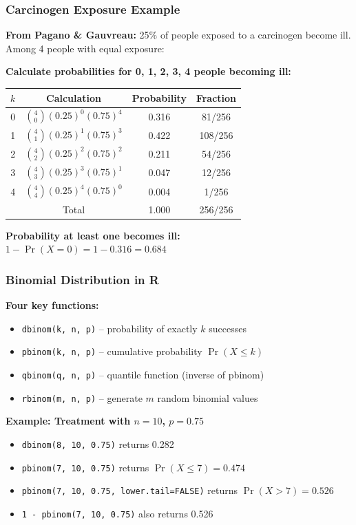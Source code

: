 \documentclass{beamer}
\begin{document}
\begin{frame}
\frametitle{Carcinogen Exposure Example}
\textbf{From Pagano \& Gauvreau:} 25\% of people exposed to a carcinogen become ill. Among 4 people with equal exposure:

\vspace{0.3cm}
\textbf{Calculate probabilities for 0, 1, 2, 3, 4 people becoming ill:}

\begin{center}
\begin{tabular}{cccc}
\toprule
$k$ & Calculation & Probability & Fraction \\
\midrule
0 & $\displaystyle\binom{4}{0}(0.25)^0(0.75)^4$ & 0.316 & 81/256 \\[0.4cm]
1 & $\displaystyle\binom{4}{1}(0.25)^1(0.75)^3$ & 0.422 & 108/256 \\[0.4cm]
2 & $\displaystyle\binom{4}{2}(0.25)^2(0.75)^2$ & 0.211 & 54/256 \\[0.4cm]
3 & $\displaystyle\binom{4}{3}(0.25)^3(0.75)^1$ & 0.047 & 12/256 \\[0.4cm]
4 & $\displaystyle\binom{4}{4}(0.25)^4(0.75)^0$ & 0.004 & 1/256 \\[0.4cm]
\midrule
 & Total & 1.000 & 256/256 \\
\bottomrule
\end{tabular}
\end{center}

\vspace{0.2cm}
\textbf{Probability at least one becomes ill:}\\
$1 - \Pr(X=0) = 1 - 0.316 = 0.684$
\end{frame}

\begin{frame}
\frametitle{Binomial Distribution in R}
\textbf{Four key functions:}

\vspace{0.3cm}
\begin{itemize}
\item \texttt{dbinom(k, n, p)} -- probability of exactly $k$ successes
\item \texttt{pbinom(k, n, p)} -- cumulative probability $\Pr(X \leq k)$
\item \texttt{qbinom(q, n, p)} -- quantile function (inverse of pbinom)
\item \texttt{rbinom(m, n, p)} -- generate $m$ random binomial values
\end{itemize}

\vspace{0.5cm}
\textbf{Example: Treatment with $n=10$, $p=0.75$}
\begin{itemize}
\item \texttt{dbinom(8, 10, 0.75)} returns 0.282
\item \texttt{pbinom(7, 10, 0.75)} returns $\Pr(X \leq 7) = 0.474$
\item \texttt{pbinom(7, 10, 0.75, lower.tail=FALSE)} returns $\Pr(X > 7) = 0.526$
\item \texttt{1 - pbinom(7, 10, 0.75)} also returns 0.526
\end{itemize}
\end{frame}
\end{document}
